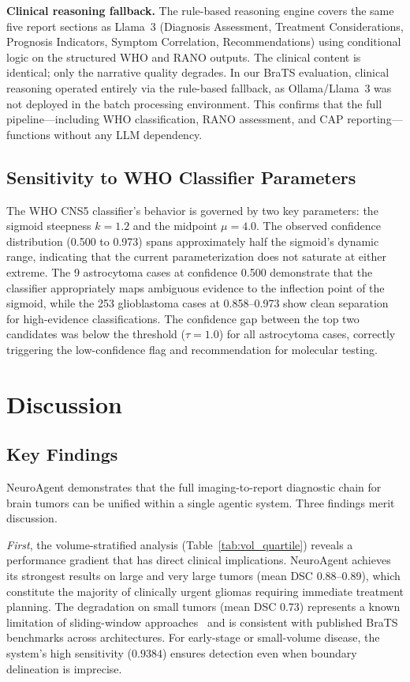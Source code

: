 \textbf{Clinical reasoning fallback.} The rule-based reasoning engine covers the same five report sections as Llama~3 (Diagnosis Assessment, Treatment Considerations, Prognosis Indicators, Symptom Correlation, Recommendations) using conditional logic on the structured WHO and RANO outputs. The clinical content is identical; only the narrative quality degrades. In our BraTS evaluation, clinical reasoning operated entirely via the rule-based fallback, as Ollama/Llama~3 was not deployed in the batch processing environment. This confirms that the full pipeline---including WHO classification, RANO assessment, and CAP reporting---functions without any LLM dependency.

\subsection{Sensitivity to WHO Classifier Parameters}

The WHO CNS5 classifier's behavior is governed by two key parameters: the sigmoid steepness $k = 1.2$ and the midpoint $\mu = 4.0$. The observed confidence distribution (0.500 to 0.973) spans approximately half the sigmoid's dynamic range, indicating that the current parameterization does not saturate at either extreme. The 9 astrocytoma cases at confidence 0.500 demonstrate that the classifier appropriately maps ambiguous evidence to the inflection point of the sigmoid, while the 253 glioblastoma cases at 0.858--0.973 show clean separation for high-evidence classifications. The confidence gap between the top two candidates was below the threshold ($\tau = 1.0$) for all astrocytoma cases, correctly triggering the low-confidence flag and recommendation for molecular testing.


\section{Discussion}

\subsection{Key Findings}
NeuroAgent demonstrates that the full imaging-to-report diagnostic chain for brain tumors can be unified within a single agentic system. Three findings merit discussion.

\textit{First}, the volume-stratified analysis (Table~\ref{tab:vol_quartile}) reveals a performance gradient that has direct clinical implications. NeuroAgent achieves its strongest results on large and very large tumors (mean DSC 0.88--0.89), which constitute the majority of clinically urgent gliomas requiring immediate treatment planning. The degradation on small tumors (mean DSC 0.73) represents a known limitation of sliding-window approaches~\cite{isensee2021nnu} and is consistent with published BraTS benchmarks across architectures. For early-stage or small-volume disease, the system's high sensitivity ($0.9384$) ensures detection even when boundary delineation is imprecise.

